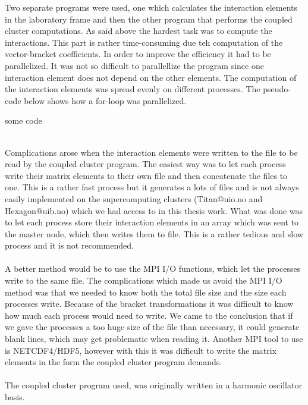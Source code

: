 Two separate programs were used, one which calculates the interaction elements in
the laboratory frame and then the other program that performs the coupled cluster
computations. As said above the hardest task was to compute the interactions. This part is rather
time-consuming  due teh computation of the vector-bracket coefficients.  In order to improve
the efficiency it had to be parallelized. It was not so difficult to parallellize the program since one interaction element does not depend on the other elements. 
The computation of the interaction elements was 
spread evenly on different processes.  
The pseudo-code below shows how a for-loop was parallelized.
\begin{algorithm}
\begin{algorithmic}
         \STATE   some code
        \ENDFOR
\end{algorithmic}
\end{algorithm}\\
Complications
arose when the interaction elements were written to the file to be read by the coupled cluster
program.  The easiest way was to let each process write their matrix elements
to their own file and then concatenate the files to one. This is a rather fast
process but it generates a lots of files and is not always easily implemented on the supercomputing
clusters (Titan@uio.no and Hexagon@uib.no) which we had access to in this thesis work.
What was done was to let each process store their interaction elements in
an array which was sent to the master node, which then writes them to file. This
is a rather tedious and slow process and it is not recommended.\\
\\
A better method
would be to use the MPI I/O functions, which let the processes write to the
same file. The complications which made us avoid the MPI I/O method was that we
needed to know both the total file size and the size each processes write.
Because of the bracket transformations it was difficult to 
know how much each process would need to
write. We came to the conclusion that if we gave the processes a too huge size
of the file than necessary, it could generate blank lines, which may get problematic when reading it. Another MPI tool to use is NETCDF4/HDF5, however with this it was difficult to write the matrix elements in the form the coupled cluster
program demands.\\
\\
The coupled cluster program used, was originally written in a harmonic oscillator basis. 
